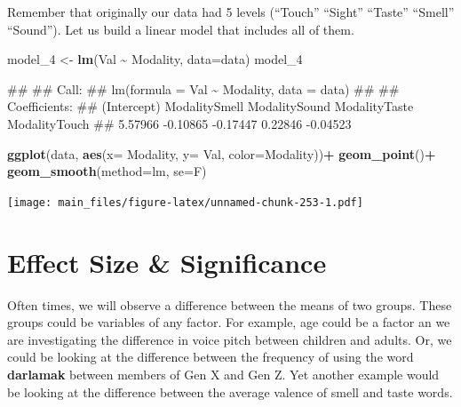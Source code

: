 \documentclass[
]{book}
\newenvironment{Shaded}{\begin{snugshade}}{\end{snugshade}}
\newcommand{\AttributeTok}[1]{\textcolor[rgb]{0.13,0.29,0.53}{#1}}
\newcommand{\FunctionTok}[1]{\textcolor[rgb]{0.13,0.29,0.53}{\textbf{#1}}}
\newcommand{\NormalTok}[1]{#1}
\newcommand{\OtherTok}[1]{\textcolor[rgb]{0.56,0.35,0.01}{#1}}
\newcommand{\SpecialCharTok}[1]{\textcolor[rgb]{0.81,0.36,0.00}{\textbf{#1}}}
\newcommand{\StringTok}[1]{\textcolor[rgb]{0.31,0.60,0.02}{#1}}
\begin{document}
Remember that originally our data had 5 levels (``Touch'' ``Sight'' ``Taste'' ``Smell'' ``Sound''). Let us build a linear model that includes all of them.

\begin{Shaded}
\begin{Highlighting}[]
\NormalTok{model\_4 }\OtherTok{\textless{}{-}} \FunctionTok{lm}\NormalTok{(Val }\SpecialCharTok{\textasciitilde{}}\NormalTok{ Modality, }\AttributeTok{data=}\NormalTok{data)}
\NormalTok{model\_4}
\end{Highlighting}
\end{Shaded}

\begin{Shaded}
\begin{Highlighting}[]
\NormalTok{\#\# }
\NormalTok{\#\# Call:}
\NormalTok{\#\# lm(formula = Val \textasciitilde{} Modality, data = data)}
\NormalTok{\#\# }
\NormalTok{\#\# Coefficients:}
\NormalTok{\#\#   (Intercept)  ModalitySmell  ModalitySound  ModalityTaste  ModalityTouch  }
\NormalTok{\#\#       5.57966       {-}0.10865       {-}0.17447        0.22846       {-}0.04523}
\end{Highlighting}
\end{Shaded}

\begin{Shaded}
\begin{Highlighting}[]
\FunctionTok{ggplot}\NormalTok{(data, }\FunctionTok{aes}\NormalTok{(}\AttributeTok{x=}\NormalTok{ Modality, }\AttributeTok{y=}\NormalTok{ Val, }\AttributeTok{color=}\NormalTok{Modality))}\SpecialCharTok{+}
  \FunctionTok{geom\_point}\NormalTok{()}\SpecialCharTok{+}
  \FunctionTok{geom\_smooth}\NormalTok{(}\AttributeTok{method=}\StringTok{\textquotesingle{}lm\textquotesingle{}}\NormalTok{, }\AttributeTok{se=}\NormalTok{F)}
\end{Highlighting}
\end{Shaded}

\texttt{[image: main\_files/figure-latex/unnamed-chunk-253-1.pdf]}

\hypertarget{effect-size-significance}{%
\chapter{Effect Size \& Significance}\label{effect-size-significance}}

Often times, we will observe a difference between the means of two groups. These groups could be variables of any factor. For example, age could be a factor an we are investigating the difference in voice pitch between children and adults. Or, we could be looking at the difference between the frequency of using the word \textbf{darlamak} between members of Gen X and Gen Z. Yet another example would be looking at the difference between the average valence of smell and taste words.
\end{document}
